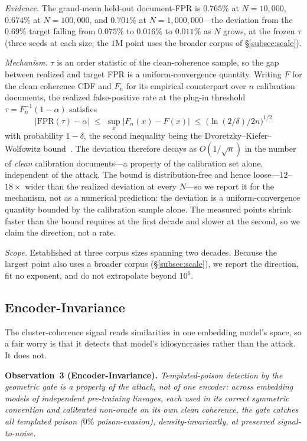 \documentclass[10pt,journal,compsoc]{IEEEtran}
\begin{document}
\emph{Evidence.} The grand-mean held-out document-FPR is $0.765\%$ at $N=10{,}000$,
$0.674\%$ at $N=100{,}000$, and $0.701\%$ at $N=1{,}000{,}000$---the deviation from the
$0.69\%$ target falling from $0.075\%$ to $0.016\%$ to $0.011\%$ as $N$ grows, at the
frozen $\tau$ (three seeds at each size; the $1$M point uses the broader corpus of
\S\ref{subsec:scale}).

\emph{Mechanism.} $\tau$ is an order statistic of the clean-coherence sample, so the gap
between realized and target FPR is a uniform-convergence quantity. Writing $F$ for the clean
coherence CDF and $F_n$ for its empirical counterpart over $n$ calibration documents, the
realized false-positive rate at the plug-in threshold $\tau=F_n^{-1}(1-\alpha)$ satisfies
\[
  \bigl|\mathrm{FPR}(\tau)-\alpha\bigr| \;\le\; \sup_x \bigl|F_n(x)-F(x)\bigr|
  \;\le\; \bigl(\ln(2/\delta)/2n\bigr)^{1/2}
\]
with probability $1-\delta$, the second inequality being the
Dvoretzky--Kiefer--Wolfowitz bound~\cite{dkw}. The deviation therefore decays as
$O(1/\sqrt{n})$ in the number of \emph{clean} calibration documents---a property of the
calibration set alone, independent of the attack. The bound is distribution-free and hence
loose---$12$--$18\times$ wider than the realized deviation at every $N$---so we report it for
the mechanism, not as a numerical prediction: the deviation is a uniform-convergence quantity
bounded by the calibration sample alone. The measured points shrink faster than the bound
requires at the first decade and slower at the second, so we claim the direction, not a rate.

\emph{Scope.} Established at three corpus sizes spanning two decades. Because the largest
point also uses a broader corpus (\S\ref{subsec:scale}), we report the direction, fit no
exponent, and do not extrapolate beyond $10^{6}$.

\subsection{Encoder-Invariance}
\label{subsec:encoder}

The cluster-coherence signal reads similarities in one embedding model's space, so a
fair worry is that it detects that model's idiosyncrasies rather than the attack. It
does not.

\smallskip
\noindent\textbf{Observation~3 (Encoder-Invariance).}
\emph{Templated-poison detection by the geometric gate is a property of the attack,
not of one encoder: across embedding models of independent pre-training lineages, each
used in its correct symmetric convention and calibrated non-oracle on its own clean
coherence, the gate catches all templated poison ($0\%$ poison-evasion), density-invariantly, at
preserved signal-to-noise.}
\end{document}
